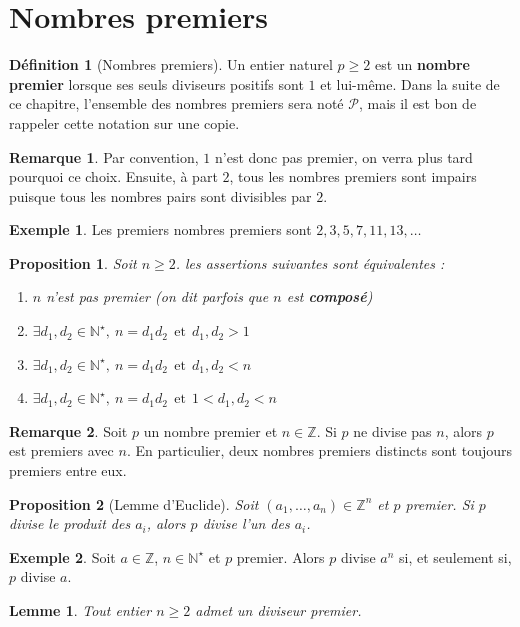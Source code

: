 \documentclass[french]{book}
\newcommand{\N}{\mathbb{N}}
\newcommand{\Z}{\mathbb{Z}}
\newcommand{\st}{^\star}
\theoremstyle{plain}
\newtheorem{lem}{Lemme}[chapter]
\newtheorem{prop}{Proposition}[chapter]
\theoremstyle{definition}
\newtheorem{dfn}{Définition}[chapter]
\newtheorem{exa}{Exemple}[chapter]
\newtheorem{rmq}{Remarque}[chapter]
\theoremstyle{remark}
\begin{document}
\section{Nombres premiers}
\begin{dfn}[Nombres premiers]
	Un entier naturel $p\geqslant2$ est un \textbf{nombre premier} lorsque ses seuls diviseurs positifs sont $1$ et lui-même. Dans la suite de ce chapitre, l'ensemble des nombres premiers sera noté $\mathcal{P}$, mais il est bon de rappeler cette notation sur une copie.
\end{dfn}
\begin{rmq}
	Par convention, $1$ n'est donc pas premier, on verra plus tard pourquoi ce choix. Ensuite, à part $2$, tous les nombres premiers sont impairs puisque tous les nombres pairs sont divisibles par $2$.
\end{rmq}
\begin{exa}
	Les premiers nombres premiers sont $2,3,5,7,11,13,\ldots$
\end{exa}
\begin{prop}
	Soit $n\geqslant2$. les assertions suivantes sont équivalentes :
	\begin{enumerate}
		\item $n$ n'est pas premier (on dit parfois que $n$ est \textbf{composé})
		\item $\exists d_1,d_2\in\N\st,\ n=d_1d_2 \ \ \text{et} \ \ d_1,d_2>1$ 
		\item $\exists d_1,d_2\in\N\st,\ n=d_1d_2 \ \ \text{et} \ \ d_1,d_2<n$
		\item $\exists d_1,d_2\in\N\st,\ n=d_1d_2 \ \ \text{et} \ \ 1<d_1,d_2<n$
	\end{enumerate}
\end{prop}
\begin{rmq}
	Soit $p$ un nombre premier et $n\in\Z$. Si $p$ ne divise pas $n$, alors $p$ est premiers avec $n$. En particulier, deux nombres premiers distincts sont toujours premiers entre eux.
\end{rmq}
\begin{prop}[Lemme d'Euclide]
	Soit $(a_1,\ldots,a_n)\in\Z^n$ et $p$ premier. Si $p$ divise le produit des $a_i$, alors $p$ divise l'un des $a_i$.
\end{prop}
\begin{exa}
	Soit $a\in\Z$, $n\in\N\st$ et $p$ premier. Alors $p$ divise $a^n$ si, et seulement si, $p$ divise $a$.
\end{exa}
\begin{lem}
	Tout entier $n\geqslant2$ admet un diviseur premier.
\end{lem}
\end{document}
